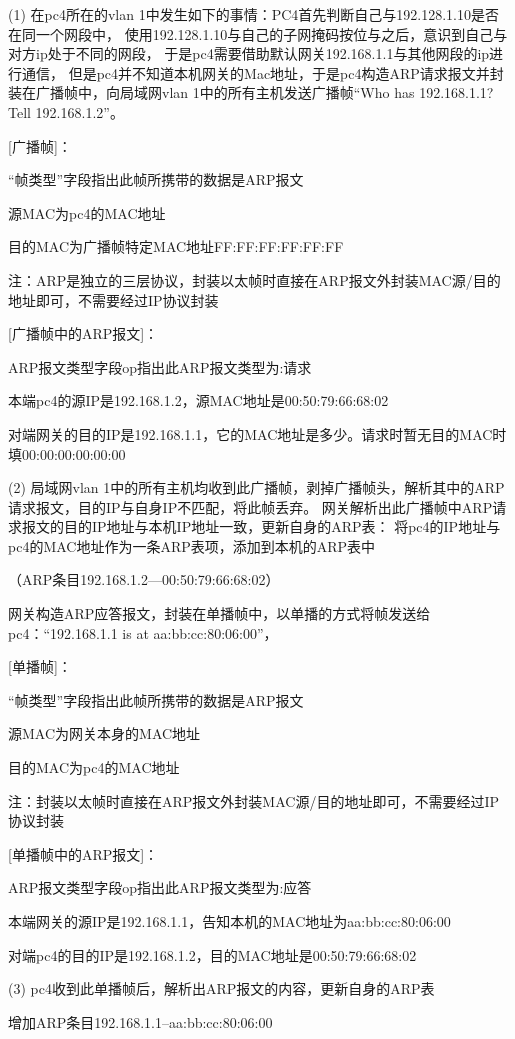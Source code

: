 \documentclass[a4paper,12pt]{report}
\begin{document}
\begin{spacing}{1.5}
(1) 在pc4所在的vlan 1中发生如下的事情：PC4首先判断自己与192.128.1.10是否在同一个网段中，
使用192.128.1.10与自己的子网掩码按位与之后，意识到自己与对方ip处于不同的网段，
于是pc4需要借助默认网关192.168.1.1与其他网段的ip进行通信，
但是pc4并不知道本机网关的Mac地址，于是pc4构造ARP请求报文并封装在广播帧中，向局域网vlan 1中的所有主机发送广播帧“Who has 192.168.1.1?Tell 192.168.1.2”。

[广播帧]：

“帧类型”字段指出此帧所携带的数据是ARP报文

源MAC为pc4的MAC地址

目的MAC为广播帧特定MAC地址FF:FF:FF:FF:FF:FF

注：ARP是独立的三层协议，封装以太帧时直接在ARP报文外封装MAC源/目的地址即可，不需要经过IP协议封装

[广播帧中的ARP报文]：

ARP报文类型字段op指出此ARP报文类型为:请求

本端pc4的源IP是192.168.1.2，源MAC地址是00:50:79:66:68:02

对端网关的目的IP是192.168.1.1，它的MAC地址是多少。请求时暂无目的MAC时填00:00:00:00:00:00


(2) 局域网vlan 1中的所有主机均收到此广播帧，剥掉广播帧头，解析其中的ARP请求报文，目的IP与自身IP不匹配，将此帧丢弃。
网关解析出此广播帧中ARP请求报文的目的IP地址与本机IP地址一致，更新自身的ARP表：
将pc4的IP地址与pc4的MAC地址作为一条ARP表项，添加到本机的ARP表中

（ARP条目192.168.1.2---00:50:79:66:68:02）


网关构造ARP应答报文，封装在单播帧中，以单播的方式将帧发送给pc4：“192.168.1.1 is at aa:bb:cc:80:06:00”，

[单播帧]：

“帧类型”字段指出此帧所携带的数据是ARP报文

源MAC为网关本身的MAC地址

目的MAC为pc4的MAC地址

注：封装以太帧时直接在ARP报文外封装MAC源/目的地址即可，不需要经过IP协议封装

[单播帧中的ARP报文]：

ARP报文类型字段op指出此ARP报文类型为:应答

本端网关的源IP是192.168.1.1，告知本机的MAC地址为aa:bb:cc:80:06:00

对端pc4的目的IP是192.168.1.2，目的MAC地址是00:50:79:66:68:02

(3) pc4收到此单播帧后，解析出ARP报文的内容，更新自身的ARP表

增加ARP条目192.168.1.1--aa:bb:cc:80:06:00


\end{spacing}
\end{document}
